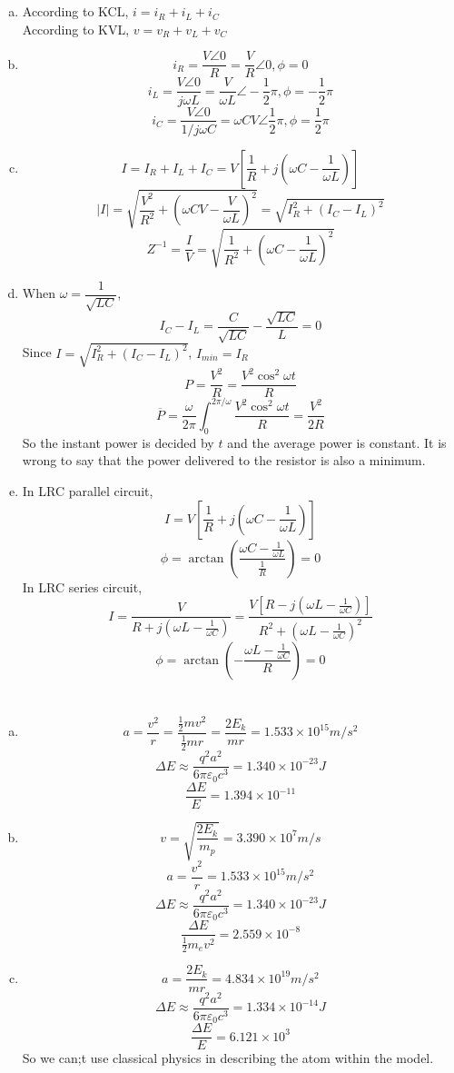 \documentclass{article}
\begin{document}
\section{}
\begin{enumerate}[(a)]
\item
According to KCL, $i=i_R+i_L+i_C$\\
According to KVL, $v=v_R+v_L+v_C$\\
\item
$$i_R=\frac{V\angle0}{R}=\frac{V}{R}\angle0,\phi=0$$
$$i_L=\frac{V\angle0}{j\omega L}=\frac{V}{\omega L}\angle-\frac{1}{2}\pi,\phi=-\frac{1}{2}\pi$$
$$i_C=\frac{V\angle0}{1/j\omega C}=\omega CV\angle\frac{1}{2}\pi,\phi=\frac{1}{2}\pi$$
\item
$$I=I_R+I_L+I_C=V\left[\frac{1}{R}+j\left(\omega C-\frac{1}{\omega L}\right)\right]$$
$$|I|=\sqrt{\frac{V^2}{R^2}+\left(\omega CV-\frac{V}{\omega L}\right)^2}=\sqrt{I_R^2+(I_C-I_L)^2}$$
$$Z^{-1}=\frac{I}{V}=\sqrt{\frac{1}{R^2}+\left(\omega C-\frac{1}{\omega L}\right)^2}$$
\item
When $\omega=\dfrac{1}{\sqrt{LC}}$,
$$I_C-I_L=\frac{C}{\sqrt{LC}}-\frac{\sqrt{LC}}{L}=0$$
Since $I=\sqrt{I_R^2+(I_C-I_L)^2}$, $I_{min}=I_R$
$$P=\frac{V^2}{R}=\frac{V^2\cos^2\omega t}{R}$$
$$\overline{P}=\frac{\omega}{2\pi}\int_0^{2\pi/\omega}\frac{V^2\cos^2\omega t}{R}=\frac{V^2}{2R}$$
So the instant power is decided by $t$ and the average power is constant. It is wrong to say that the power delivered to the resistor is also a minimum.
\item
In LRC parallel circuit,
$$I=V\left[\frac{1}{R}+j\left(\omega C-\frac{1}{\omega L}\right)\right]$$
$$\phi=\arctan\left(\frac{\omega C-\frac{1}{\omega L}}{\frac{1}{R}}\right)=0$$
In LRC series circuit,
$$I=\frac{V}{R+j\left(\omega L-\frac{1}{\omega C}\right)}=\frac{V\left[R-j\left(\omega L-\frac{1}{\omega C}\right)\right]}{R^2+\left(\omega L-\frac{1}{\omega C}\right)^2}$$
$$\phi=\arctan\left(-\frac{\omega L-\frac{1}{\omega C}}{R}\right)=0$$

\end{enumerate}

\section{}
\begin{enumerate}[(a)]
\item
$$a=\frac{v^2}{r}=\frac{\frac{1}{2}mv^2}{\frac{1}{2}mr}=\frac{2E_k}{mr}=1.533\times10^{15}m/s^2$$
$$\Delta E\approx\frac{q^2a^2}{6\pi\varepsilon_0c^3}=1.340\times10^{-23}J$$
$$\frac{\Delta E}{E}=1.394\times10^{-11}$$
\item
$$v=\sqrt{\frac{2E_k}{m_p}}=3.390\times10^7m/s$$
$$a=\frac{v^2}{r}=1.533\times10^{15}m/s^2$$
$$\Delta E\approx\frac{q^2a^2}{6\pi\varepsilon_0c^3}=1.340\times10^{-23}J$$
$$\frac{\Delta E}{\frac{1}{2}m_ev^2}=2.559\times10^{-8}$$
\item
$$a=\frac{2E_k}{mr}=4.834\times10^{19}m/s^2$$
$$\Delta E\approx\frac{q^2a^2}{6\pi\varepsilon_0c^3}=1.334\times10^{-14}J$$
$$\frac{\Delta E}{E}=6.121\times10^3$$
So we can;t use classical physics in describing the atom within the model.
\end{enumerate}
\end{document}
